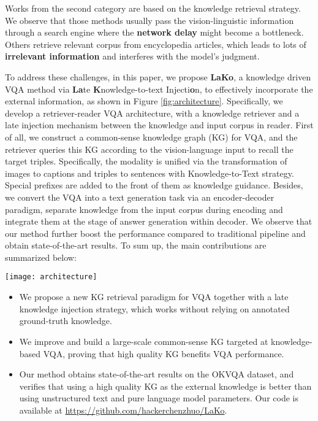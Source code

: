 \documentclass[sigconf]{acmart}
\newcommand{\cjy}[1]{{\color{black}#1}}
\newcommand{\Jeff}[1]{{\color{black}#1}}
\begin{document}
Works from the second category are based on the knowledge retrieval strategy.
We observe that those methods \citep{DBLP:conf/ijcai/ZhuYWS0W20,DBLP:journals/corr/abs-2109-04014,DBLP:conf/sigir/QuZ0CL21,DBLP:conf/sigir/JainKKJRC21} usually pass the vision-linguistic information through a search engine 
where the \textbf{network delay} might become a bottleneck. 
Others retrieve relevant corpus from encyclopedia articles, which leads to lots of \textbf{irrelevant information} and interferes with the model's judgment.


To address these challenges, in this paper, we propose \textbf{LaKo}, a knowledge driven VQA method via \textbf{La}te \textbf{K}nowledge-to-text Injecti\textbf{o}n, to effectively incorporate the external information, as shown in \cjy{Figure} \ref{fig:architecture}.
Specifically, we develop a \Jeff{retriever-reader VQA architecture, with} \cjy{a} knowledge retriever and a late injection mechanism between the knowledge and input corpus in reader.
First of all, 
we construct a common-sense knowledge graph (KG) for VQA, and 
the retriever queries this KG according to the vision-language input to recall the target triples. 
Specifically, the modality is unified  via the transformation of images to captions and triples to sentences with  Knowledge-to-Text strategy. Special prefixes are added to the front of them as knowledge guidance. 
Besides, we convert the VQA into a text generation task via an encoder-decoder paradigm, separate knowledge from the input corpus during encoding and integrate them at the stage of answer generation within decoder.
We observe that our method further boost the performance compared to traditional pipeline and obtain state-of-the-art results. 
To sum up, the main contributions are summarized below:
\begin{figure*}[htbp]
\texttt{[image: architecture]}
    \caption{The overview model architecture of LaKo. Given a () pair, the generated background text and knowledge text retrieved by vision-language KG retriever are separately send to reader  for late knowledge injection. The predicted  tokens are decoded in turn.} 
  \label{fig:architecture}
  \vspace{-1mm}
\end{figure*}
\begin{itemize}
    \item We propose a new KG retrieval paradigm \Jeff{for} VQA together with a late knowledge injection strategy, which \Jeff{works without relying} on annotated ground-truth knowledge.
    \item We improve and build a large-scale common-sense KG targeted at knowledge-based VQA, proving that high quality KG benefits VQA performance.
    \item Our method obtains state-of-the-art results on \cjy{the} OKVQA dataset, 
\cjy{and verifies that using a high quality KG as the external knowledge is better than using unstructured text and pure language model parameters}. 
    Our code is available at \url{https://github.com/hackerchenzhuo/LaKo}.
\end{itemize}
\end{document}
